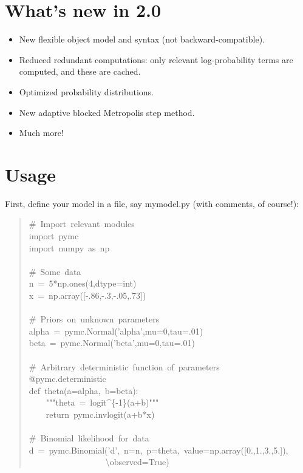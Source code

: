 
\hypertarget{what-s-new-in-2-0}{}
\section{What's new in 2.0}
\label{what-s-new-in-2-0}
\begin{itemize}
\item {} 
New flexible object model and syntax (not backward-compatible).

\item {} 
Reduced redundant computations: only relevant log-probability terms are
computed, and these are cached.

\item {} 
Optimized probability distributions.

\item {} 
New adaptive blocked Metropolis step method.

\item {} 
Much more!

\end{itemize}



\hypertarget{usage}{}
\section{Usage}
\label{usage}

First, define your model in a file, say mymodel.py (with comments, of course!):
\begin{quote}{\ttfamily \raggedright \noindent
{\#}~Import~relevant~modules~\\
import~pymc~\\
import~numpy~as~np~\\
~\\
{\#}~Some~data~\\
n~=~5*np.ones(4,dtype=int)~\\
x~=~np.array({[}-.86,-.3,-.05,.73{]})~\\
~\\
{\#}~Priors~on~unknown~parameters~\\
alpha~=~pymc.Normal('alpha',mu=0,tau=.01)~\\
beta~=~pymc.Normal('beta',mu=0,tau=.01)~\\
~\\
{\#}~Arbitrary~deterministic~function~of~parameters~\\
@pymc.deterministic~\\
def~theta(a=alpha,~b=beta):~\\
~~~~"{}"{}"theta~=~logit{\textasciicircum}{\{}-1{\}}(a+b)"{}"{}"~\\
~~~~return~pymc.invlogit(a+b*x)~\\
~\\
{\#}~Binomial~likelihood~for~data~\\
d~=~pymc.Binomial('d',~n=n,~p=theta,~value=np.array({[}0.,1.,3.,5.{]}),~\\
~~~~~~~~~~~~~~~~~~{\textbackslash}observed=True)
}\end{quote}

